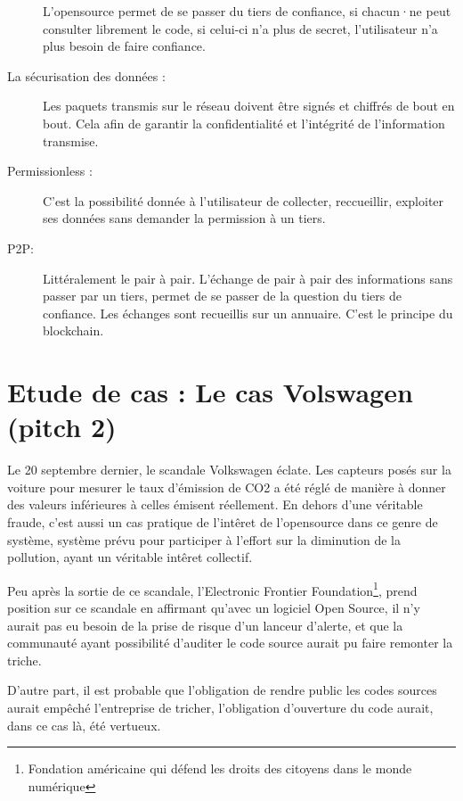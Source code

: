 \documentclass[a4paper,12pt]{article}
\begin{document}
\begin{description}
L'opensource permet de se passer du tiers de confiance, si chacun·ne peut consulter librement le code, si celui-ci n'a plus de secret, l'utilisateur n'a plus besoin de faire confiance.  
		\item [La sécurisation des données : ] Les paquets transmis sur le réseau doivent être signés et chiffrés de bout en bout. Cela afin de garantir la confidentialité et l'intégrité de l'information transmise. 
		\item [Permissionless : ] C'est la possibilité donnée à l'utilisateur de collecter, reccueillir, exploiter ses données sans demander la permission à un tiers. 
		\item [P2P: ] Littéralement le pair à pair. L'échange de pair à pair des informations sans passer par un tiers, permet de se passer de la question du tiers de confiance. Les échanges sont recueillis sur un annuaire. C'est le principe du blockchain.
	\end{description}

\section{Etude de cas : Le cas Volswagen (pitch 2)}
Le 20 septembre dernier, le scandale Volkswagen éclate. Les capteurs posés sur la voiture pour mesurer le taux d'émission de CO2 a été réglé de manière à donner des valeurs inférieures à celles émisent réellement. En dehors d'une véritable fraude, c'est aussi un cas pratique de l'intêret de l'opensource dans ce genre de système, système prévu pour participer à l'effort sur la diminution de la pollution, ayant un véritable intêret collectif. 

Peu après la sortie de ce scandale, l'Electronic Frontier Foundation\footnote{Fondation américaine qui défend les droits des citoyens dans le monde numérique}, prend position sur ce scandale en affirmant qu'avec un logiciel Open Source, il n'y aurait pas eu besoin de la prise de risque d'un lanceur d'alerte, et que la communauté ayant possibilité d'auditer le code source aurait pu faire remonter la triche.

D'autre part, il est probable que l'obligation de rendre public les codes sources aurait empêché l'entreprise de tricher, l'obligation d'ouverture du code aurait, dans ce cas là, été vertueux. 
\end{document}
